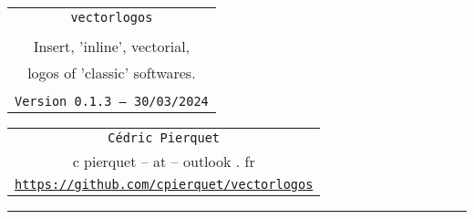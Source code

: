 \documentclass[11pt,a4paper]{ltxdoc}
\def\TPversion{0.1.3}
\def\TPdate{30/03/2024}
\begin{document}
\pagestyle{fancy}

\thispagestyle{empty}

\begin{center}
	\begin{minipage}{0.88\linewidth}
	\begin{tcolorbox}[colframe=yellow,colback=yellow!15]
		\begin{center}
			\begin{tabular}{c}
				{\Huge \texttt{vectorlogos}}\\
				\\
				{\LARGE Insert, 'inline', vectorial,} \\
				{\LARGE logos of 'classic' softwares.} \\
				\\
				{\small \texttt{Version \TPversion{} -- \TPdate}}
		\end{tabular}
		\end{center}
	\end{tcolorbox}
\end{minipage}
\end{center}

\begin{center}
	\begin{tabular}{c}
	\texttt{Cédric Pierquet}\\
	{\ttfamily c pierquet -- at -- outlook . fr}\\
	\texttt{\url{https://github.com/cpierquet/vectorlogos}} \\
\end{tabular}
\end{center}

\hrule

\vfill
\end{document}
